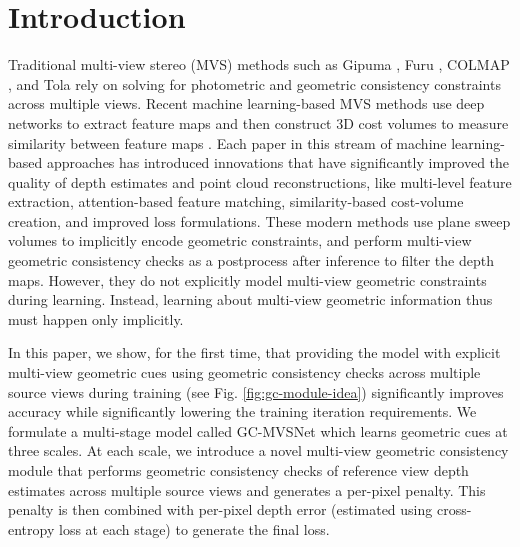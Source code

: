 \documentclass[10pt,twocolumn,letterpaper]{article}
\begin{document}
\vspace{-18pt}
\section{Introduction}\label{sec:intro}

Traditional multi-view stereo (MVS) methods such as Gipuma
\cite{Galliani2015fusibile}, Furu \cite{Furukawa2010AccurateDA},
COLMAP \cite{Johannes2016pixelwise}, and Tola
\cite{tola2011largescale} rely on solving for photometric and
geometric consistency constraints across multiple views.  Recent
machine learning-based MVS methods \cite{ding2022transmvsnet,
  peng2022rethinkingMVS, Luo2019Pmvsnet, yao2019recurrent,
  chen2019pointbased, gu2019casmvsnet, yang2019CVPMVS,
  Cheng2019USCNet, wei2021aa, xu2019multiscale, yao2018mvsnet,
  YU2021AAcostvolume} use deep networks to extract feature maps and
then construct 3D cost volumes to measure similarity between feature
maps \cite{gu2019casmvsnet}.
Each paper in this stream of machine learning-based approaches    has introduced innovations that have significantly improved
the quality of depth estimates and point cloud
reconstructions,
like multi-level feature 
extraction, attention-based feature matching, similarity-based 
cost-volume creation, and improved loss formulations.
These modern methods use plane sweep
volumes to implicitly encode geometric constraints,
and perform multi-view geometric
consistency checks as a postprocess after inference to filter the depth maps.
However,
they do not
explicitly 
model
multi-view geometric constraints during learning. Instead,
learning about multi-view geometric
information thus must happen only implicitly.



In this paper, we show, for the first time, that providing the model with explicit multi-view geometric
cues using geometric consistency checks across multiple source
views during training  (see Fig. \ref{fig:gc-module-idea}) significantly improves
accuracy while significantly lowering the training iteration requirements.
We formulate a multi-stage model called GC-MVSNet which learns
geometric cues at three scales.
At each scale,
we introduce a novel multi-view geometric consistency module that performs geometric
consistency checks of reference view depth estimates across multiple
source views and generates a per-pixel penalty. This
penalty is then combined with per-pixel depth error
(estimated using cross-entropy loss at each stage) to generate the final loss.
\end{document}

